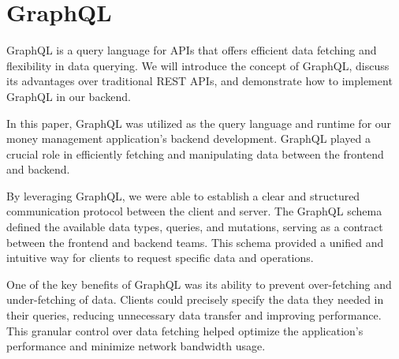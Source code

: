 \section{GraphQL}
\label{sec:graphql}

GraphQL is a query language for APIs that offers efficient data fetching and flexibility in data querying. We will introduce the concept of GraphQL, discuss its advantages over traditional REST APIs, and demonstrate how to implement GraphQL in our backend.

In this paper, GraphQL was utilized as the query language and runtime for our money management application's backend development. GraphQL played a crucial role in efficiently fetching and manipulating data between the frontend and backend.

By leveraging GraphQL, we were able to establish a clear and structured communication protocol between the client and server. The GraphQL schema defined the available data types, queries, and mutations, serving as a contract between the frontend and backend teams. This schema provided a unified and intuitive way for clients to request specific data and operations.

One of the key benefits of GraphQL was its ability to prevent over-fetching and under-fetching of data. Clients could precisely specify the data they needed in their queries, reducing unnecessary data transfer and improving performance. This granular control over data fetching helped optimize the application's performance and minimize network bandwidth usage.

